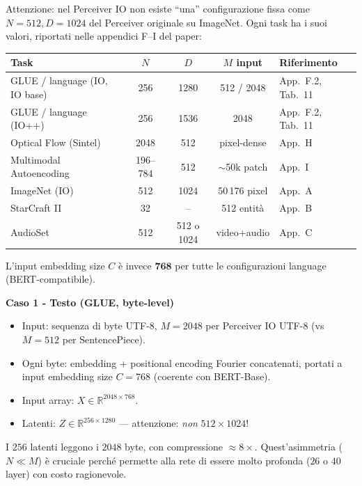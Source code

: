 \documentclass[
  11pt,
]{article}
\begin{document}
\begin{notabox}[title={\textbf{Le dimensioni $N$ e $D$ dei latenti variano con il task}}]
Attenzione: nel Perceiver IO non esiste ``una'' configurazione fissa come $N=512, D=1024$ del Perceiver originale su ImageNet. Ogni task ha i suoi valori, riportati nelle appendici F--I del paper:

\medskip
\begin{center}
{\small
\begin{tabular}{@{}lcccl@{}}
\toprule
\textbf{Task} & \textbf{$N$} & \textbf{$D$} & \textbf{$M$ input} & \textbf{Riferimento} \\
\midrule
GLUE / language (IO, IO base) & 256 & 1280 & 512 / 2048 & App.\ F.2, Tab.\ 11 \\
GLUE / language (IO++) & 256 & 1536 & 2048 & App.\ F.2, Tab.\ 11 \\
Optical Flow (Sintel) & 2048 & 512 & pixel-dense & App.\ H \\
Multimodal Autoencoding & 196--784 & 512 & $\sim$50k patch & App.\ I \\
ImageNet (IO) & 512 & 1024 & 50\,176 pixel & App.\ A \\
StarCraft II & 32 & -- & 512 entità & App.\ B \\
AudioSet & 512 & 512 o 1024 & video+audio & App.\ C \\
\bottomrule
\end{tabular}
}
\end{center}
\medskip
L'input embedding size $C$ è invece $\mathbf{768}$ per tutte le configurazioni language (BERT-compatibile).
\end{notabox}

\textbf{Caso 1 - Testo (GLUE, byte-level)}

\begin{itemize}
\item Input: sequenza di byte UTF-8, $M = 2048$ per Perceiver IO UTF-8 (vs $M = 512$ per SentencePiece).
\item Ogni byte: embedding + positional encoding Fourier concatenati, portati a input embedding size $C = 768$ (coerente con BERT-Base).
\item Input array: $X \in \mathbb{R}^{2048 \times 768}$.
\item Latenti: $Z \in \mathbb{R}^{256 \times 1280}$ --- attenzione: \emph{non} $512 \times 1024$!
\end{itemize}

I $256$ latenti leggono i $2048$ byte, con compressione $\approx 8\times$. Quest'asimmetria ($N \ll M$) è cruciale perché permette alla rete di essere molto profonda ($26$ o $40$ layer) con costo ragionevole.
\end{document}
